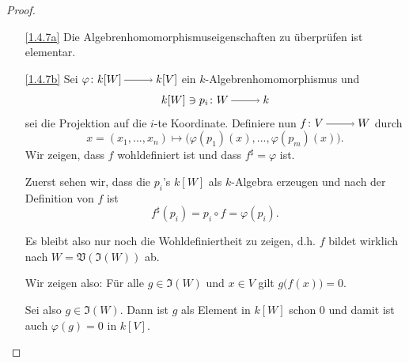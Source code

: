 \documentclass[a4paper,12pt,index=toc]{scrbook}
\theoremstyle{keinenummern} %
\def\V{\mathfrak{V}}
\def\I{\mathfrak{I}}
\renewcommand{\phi}{\varphi}
\renewcommand{\dotsc}{\ensuremath{\!...}}
\begin{document}
\begin{proof}
\begin{enumerate}
\item[\ref{1.4.7a}] Die Algebrenhomomorphismuseigenschaften zu überprüfen ist elementar.
\item[\ref{1.4.7b}] Sei $\phi\colon  k[W]\ra k[V]$ ein $k$-Algebrenhomomorphismus und \begin{equation*}k[W]\ni p_i\colon  W\ra k\end{equation*} sei die Projektion auf die $i$-te Koordinate.
Definiere nun $f\colon V\ra W$ durch \begin{equation*}x=(x_1,\dotsc,x_n)\mapsto \bigl(\phi(p_1)(x),\dotsc,\phi(p_m)(x)\bigr).\end{equation*}
Wir zeigen, dass $f$ wohldefiniert ist und dass $f^{\sharp}=\phi$ ist.

Zuerst sehen wir, dass die $p_i$'s $k[W]$ als $k$-Algebra erzeugen  und nach der Definition von $f$ ist 
\begin{equation*}f^{\sharp}(p_i)=p_i\circ f=\phi(p_i).\end{equation*}

Es bleibt also nur noch die Wohldefiniertheit zu zeigen, d.h. $f$ bildet wirklich nach $W=\V(\I(W))$ ab.

Wir zeigen also: Für alle $g \in \I(W)$ und $x\in V$ gilt $g\bigl(f(x)\bigr)=0$. 

Sei also $g\in\I(W)$. Dann ist $g$ als Element in $k[W]$ schon $0$ und damit ist auch $\phi(g)=0$ in $k[V]$. 


\end{enumerate}
\end{proof}
\end{document}

